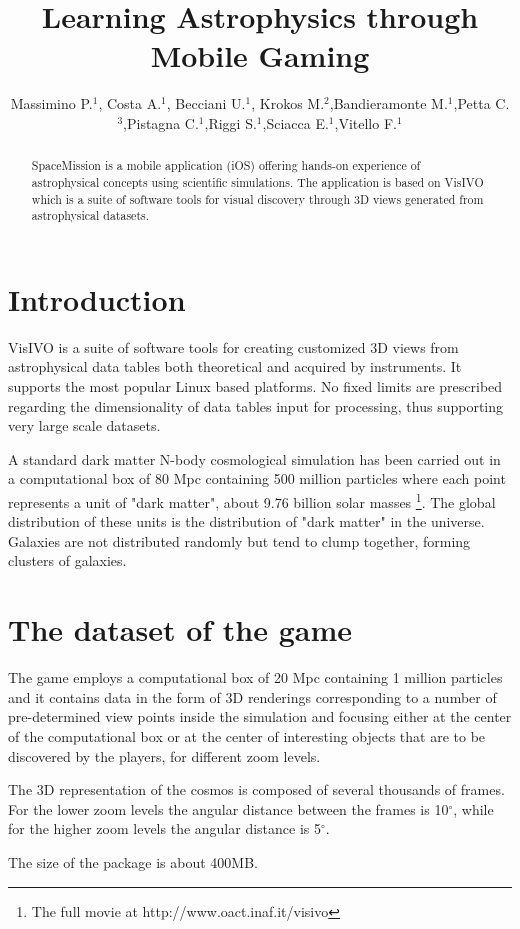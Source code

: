 \documentclass[11pt,twoside]{article}
\begin{document}
\title{Learning Astrophysics through Mobile Gaming}
\author{Massimino P.$^1$, Costa A.$^1$, Becciani U.$^1$, Krokos M.$^2$,Bandieramonte M.$^1$,Petta C.$^3$,Pistagna C.$^1$,Riggi S.$^1$,Sciacca E.$^1$,Vitello F.$^1$
}

\begin{abstract}
SpaceMission is a mobile application (iOS) offering hands-on experience of astrophysical concepts using scientific simulations. The application is based on VisIVO which is a suite of software tools for visual discovery through 3D views generated from astrophysical datasets.
\end{abstract}

\section{Introduction}
VisIVO  is a suite of software tools for creating customized 3D views from astrophysical data tables both theoretical and acquired by instruments.
It supports the most popular Linux based platforms. No fixed limits are prescribed regarding the dimensionality of data tables input for processing, thus supporting very large scale datasets.\par
A standard dark matter N-body cosmological simulation has been carried out in a computational box of 80 Mpc containing 500 million particles where each point represents a unit  of "dark matter", about 9.76 billion solar masses \footnote{The full movie at http://www.oact.inaf.it/visivo}. The global distribution of these units is the distribution of "dark matter" in the universe. Galaxies are not distributed randomly but tend to clump together, forming clusters of galaxies.\par

\section{The dataset of the game}
The game employs a computational box of 20 Mpc containing 1 million particles and 
it contains data in the form of 3D renderings corresponding to a number of pre-determined view points inside the simulation and focusing either at the center of the computational box or at the center of interesting objects that are to be discovered by the players, for different zoom levels. \par
The 3D representation of the cosmos is composed of several thousands of frames. For the lower zoom levels the angular distance  between the frames is 10$^\circ$, while for the higher zoom levels the angular distance is 5$^\circ$.\par
The size of the package is about 400MB.
\end{document}
